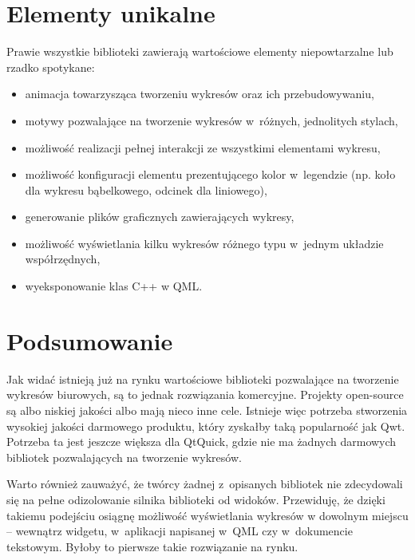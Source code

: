 \documentclass[11pt,twoside,a4paper,final]{llncs}
\begin{document}
\section{Elementy unikalne}
Prawie wszystkie biblioteki zawierają wartościowe elementy niepowtarzalne lub rzadko spotykane:
\begin{itemize}
\item{animacja towarzysząca tworzeniu wykresów oraz ich przebudowywaniu,}
\item{motywy pozwalające na tworzenie wykresów w~różnych, jednolitych stylach,}
\item{możliwość realizacji pełnej interakcji ze wszystkimi elementami wykresu,}
\item{możliwość konfiguracji elementu prezentującego kolor w~legendzie (np. koło dla wykresu bąbelkowego, odcinek dla liniowego),}
\item{generowanie plików graficznych zawierających wykresy,}
\item{możliwość wyświetlania kilku wykresów różnego typu w~jednym układzie współrzędnych,}
\item{wyeksponowanie klas C++ w QML.}
\end{itemize}

\section{Podsumowanie}
Jak widać istnieją już na rynku wartościowe biblioteki pozwalające na tworzenie wykresów biurowych, są to jednak rozwiązania komercyjne. Projekty open-source są albo niskiej jakości albo mają nieco inne cele. Istnieje więc potrzeba stworzenia wysokiej jakości darmowego produktu, który zyskałby taką popularność jak Qwt. Potrzeba ta jest jeszcze większa dla QtQuick, gdzie nie ma żadnych darmowych bibliotek pozwalających na tworzenie wykresów.\newline

Warto również zauważyć, że twórcy żadnej z~opisanych bibliotek nie zdecydowali się na pełne odizolowanie silnika biblioteki od widoków. Przewiduję, że dzięki takiemu podejściu osiągnę możliwość wyświetlania wykresów w dowolnym miejscu -- wewnątrz widgetu, w~aplikacji napisanej w~QML czy w~dokumencie tekstowym. Byłoby to pierwsze takie rozwiązanie na rynku.
\end{document}

